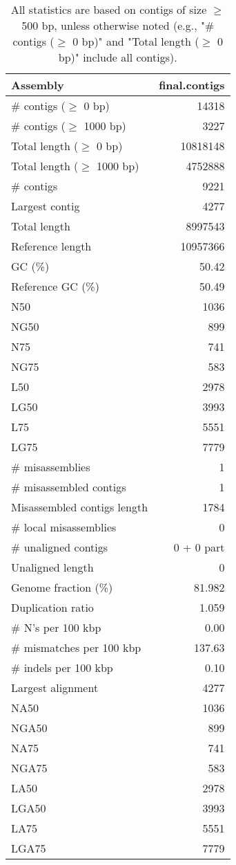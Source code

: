 \documentclass[12pt,a4paper]{article}
\begin{document}
\begin{table}[ht]
\begin{center}
\caption{All statistics are based on contigs of size $\geq$ 500 bp, unless otherwise noted (e.g., "\# contigs ($\geq$ 0 bp)" and "Total length ($\geq$ 0 bp)" include all contigs).}
\begin{tabular}{|l*{1}{|r}|}
\hline
Assembly & final.contigs \\ \hline
\# contigs ($\geq$ 0 bp) & 14318 \\ \hline
\# contigs ($\geq$ 1000 bp) & 3227 \\ \hline
Total length ($\geq$ 0 bp) & 10818148 \\ \hline
Total length ($\geq$ 1000 bp) & 4752888 \\ \hline
\# contigs & 9221 \\ \hline
Largest contig & 4277 \\ \hline
Total length & 8997543 \\ \hline
Reference length & 10957366 \\ \hline
GC (\%) & 50.42 \\ \hline
Reference GC (\%) & 50.49 \\ \hline
N50 & 1036 \\ \hline
NG50 & 899 \\ \hline
N75 & 741 \\ \hline
NG75 & 583 \\ \hline
L50 & 2978 \\ \hline
LG50 & 3993 \\ \hline
L75 & 5551 \\ \hline
LG75 & 7779 \\ \hline
\# misassemblies & 1 \\ \hline
\# misassembled contigs & 1 \\ \hline
Misassembled contigs length & 1784 \\ \hline
\# local misassemblies & 0 \\ \hline
\# unaligned contigs & 0 + 0 part \\ \hline
Unaligned length & 0 \\ \hline
Genome fraction (\%) & 81.982 \\ \hline
Duplication ratio & 1.059 \\ \hline
\# N's per 100 kbp & 0.00 \\ \hline
\# mismatches per 100 kbp & 137.63 \\ \hline
\# indels per 100 kbp & 0.10 \\ \hline
Largest alignment & 4277 \\ \hline
NA50 & 1036 \\ \hline
NGA50 & 899 \\ \hline
NA75 & 741 \\ \hline
NGA75 & 583 \\ \hline
LA50 & 2978 \\ \hline
LGA50 & 3993 \\ \hline
LA75 & 5551 \\ \hline
LGA75 & 7779 \\ \hline
\end{tabular}
\end{center}
\end{table}
\end{document}
